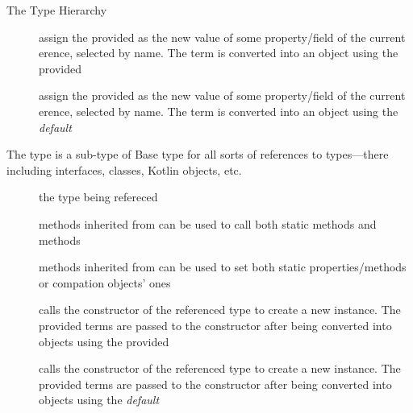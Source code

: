 \documentclass[handout]{beamer}
\begin{document}
\begin{frame}[allowframebreaks]{The  Type Hierarchy}
\begin{description}
        \item[] assign the provided  as the new value of some \alert{property}/\alert{field} of the current erence, selected by name. The term is converted into an object using the provided 

        \item[] assign the provided  as the new value of some \alert{property}/\alert{field} of the current erence, selected by name. The term is converted into an object using the \emph{default} 
    \end{description}

    \framebreak

    \begin{block}{The  type is a sub-type of }
        \centering
        Base type for all sorts of references to \alert{types}---there including interfaces, classes, Kotlin objects, etc.
    \end{block}
    \begin{description}
        \item[] the type being refereced

        \item[] methods inherited from  can be used to call both \alert{static} methods and  methods
        
        \item[] methods inherited from  can be used to set both static properties/methods or compation objects' ones
        
        \item[] calls the constructor of the referenced type to create a new instance. The provided terms are passed to the constructor after being converted into objects using the provided 
        
        \item[] calls the constructor of the referenced type to create a new instance. The provided terms are passed to the constructor after being converted into objects using the \emph{default} 
    \end{description}

    \framebreak


\end{frame}
\end{document}
